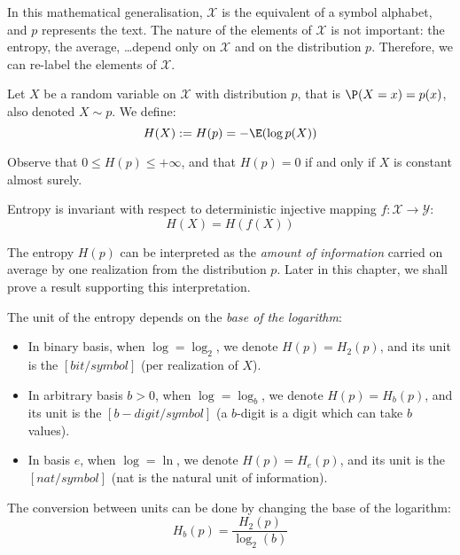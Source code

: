 \documentclass{../cs-classes/cs-classes}
\newcommand*{\X}{\mathcal{X}}
\begin{document}
\begin{remark}
    In this mathematical generalisation, $\X$ is the equivalent of a symbol alphabet, and $p$ represents the text. The nature of the elements of $\X$ is not important: the entropy, the average, \dots depend only on $\X$ and on the distribution $p$. Therefore, we can re-label the elements of $\X$.
\end{remark}

\begin{definition}
    Let $X$ be a random variable on $\X$ with distribution $p$, that is $\P(X=x) = p(x)$, also denoted $X \sim p$. We define:
    \begin{equation}
        H(X) := H(p) = -\E(\log p(X))
    \end{equation}
\end{definition}

Observe that $0\leq H(p) \leq +\infty$, and that $H(p)=0$ if and only if $X$ is constant almost surely.

\begin{property}
    Entropy is invariant with respect to deterministic injective mapping $f: \X \to \mathcal{Y}$:
    \begin{equation*}
        H(X) = H(f(X))
    \end{equation*}
\end{property}

The entropy $H(p)$ can be interpreted as the \emph{amount of information} carried on average by one realization from the distribution $p$. Later in this chapter, we shall prove a result supporting this interpretation. 

\begin{definition} The unit of the entropy depends on the \emph{base of the logarithm}:
    \begin{itemize}
        \item In binary basis, when $\log = \log_2$, we denote $H(p)=H_2(p)$, and its unit is the $[bit/symbol]$ (per realization of $X$).
        \item In arbitrary basis $b>0$, when $\log = \log_b$, we denote $H(p)=H_b(p)$, and its unit is the $[b-digit/symbol]$ (a $b$-digit is a digit which can take $b$ values).
        \item In basis $e$, when $\log = \ln$, we denote $H(p)=H_e(p)$, and its unit is the $[nat/symbol]$ (nat is the natural unit of information).
    \end{itemize}
    
    The conversion between units can be done by changing the base of the logarithm:
    \begin{equation*}
        H_b(p) = \frac{H_2(p)}{\log_2(b)}
    \end{equation*}
\end{definition}
\end{document}
